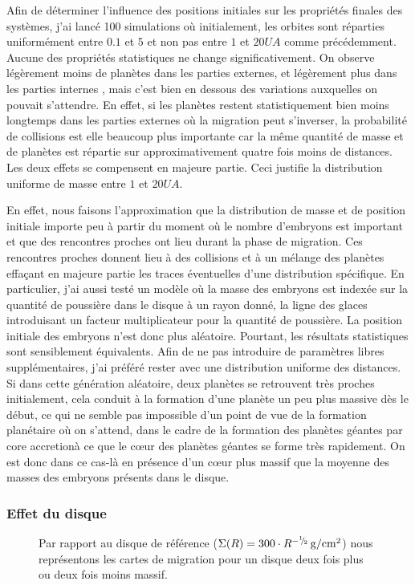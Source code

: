 Afin de déterminer l'influence des positions initiales sur les propriétés finales des systèmes, j'ai lancé 100 simulations où initialement, les orbites sont réparties uniformément entre $0.1$ et $5$ et non pas entre $1$ et $20\unit{UA}$ comme précédemment. Aucune des propriétés statistiques ne change significativement. On observe légèrement moins de planètes dans les parties externes, et légèrement plus dans les parties internes , mais c'est bien en dessous des variations auxquelles on pouvait s'attendre. En effet, si les planètes restent statistiquement bien moins longtemps dans les parties externes où la migration peut s'inverser, la probabilité de collisions est elle beaucoup plus importante car la même quantité de masse et de planètes est répartie sur approximativement quatre fois moins de distances. Les deux effets se compensent en majeure partie. Ceci justifie la distribution uniforme de masse entre $1$ et $20\unit{UA}$. 

En effet, nous faisons l'approximation que la distribution de masse et de position initiale importe peu à partir du moment où le
nombre d'embryons est important et que des rencontres proches ont lieu durant la phase de migration. Ces rencontres proches
donnent lieu à des collisions et à un mélange des planètes effaçant en majeure partie les traces éventuelles d'une distribution
spécifique. En particulier, j'ai aussi testé un modèle où la masse des embryons est indexée sur la quantité de poussière dans le
disque à un rayon donné, la ligne des glaces introduisant un facteur multiplicateur pour la quantité de poussière. La position
initiale des embryons n'est donc plus aléatoire. Pourtant, les résultats statistiques sont sensiblement équivalents. Afin de ne
pas introduire de paramètres libres supplémentaires, j'ai préféré rester avec une distribution uniforme des distances. Si dans
cette génération aléatoire, deux planètes se retrouvent très proches initialement, cela conduit à la formation d'une planète
un peu plus 
massive dès le début, ce qui ne semble pas impossible d'un point de vue de la formation planétaire où on s'attend, dans le cadre
de la formation des planètes géantes par \og core accretion\fg à ce que le cœur des planètes géantes se forme très rapidement.
On est donc dans ce cas-là en présence d'un cœur plus massif que la moyenne des masses des embryons présents dans le disque.

\subsubsection{Effet du disque}
\begin{figure}[htbp]
\centering
{}\hfill
{}

\caption[Cartes de migration des disques modélisés.]{Par rapport au disque de référence ($\Sigma(R) = 300 \cdot
R^{-{{}^{1\!\!}/ _{\!2}}}\mathrm{\thinspace g/cm^2}$) nous représentons les cartes de migration pour un disque deux fois plus ou deux fois moins
massif. }
\end{figure}

